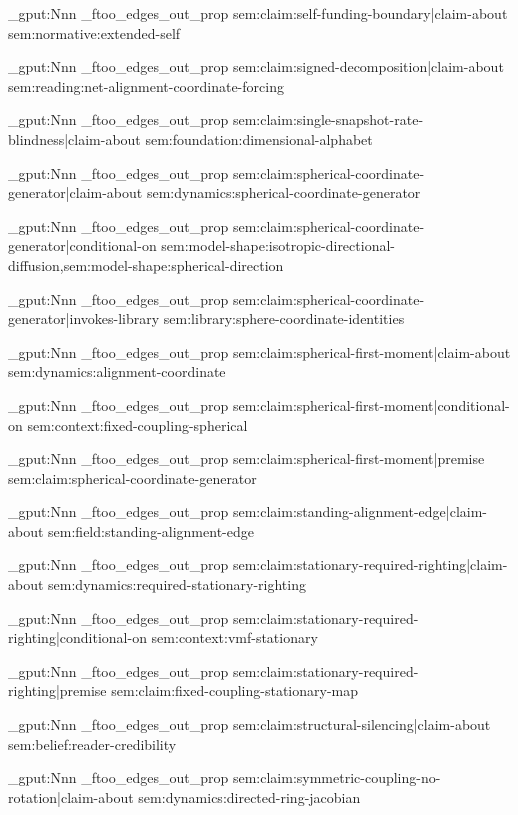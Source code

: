 \prop_gput:Nnn \g_ftoo_edges_out_prop { sem:claim:self-funding-boundary|claim-about } { sem:normative:extended-self }

\prop_gput:Nnn \g_ftoo_edges_out_prop { sem:claim:signed-decomposition|claim-about } { sem:reading:net-alignment-coordinate-forcing }

\prop_gput:Nnn \g_ftoo_edges_out_prop { sem:claim:single-snapshot-rate-blindness|claim-about } { sem:foundation:dimensional-alphabet }

\prop_gput:Nnn \g_ftoo_edges_out_prop { sem:claim:spherical-coordinate-generator|claim-about } { sem:dynamics:spherical-coordinate-generator }

\prop_gput:Nnn \g_ftoo_edges_out_prop { sem:claim:spherical-coordinate-generator|conditional-on } { sem:model-shape:isotropic-directional-diffusion,sem:model-shape:spherical-direction }

\prop_gput:Nnn \g_ftoo_edges_out_prop { sem:claim:spherical-coordinate-generator|invokes-library } { sem:library:sphere-coordinate-identities }

\prop_gput:Nnn \g_ftoo_edges_out_prop { sem:claim:spherical-first-moment|claim-about } { sem:dynamics:alignment-coordinate }

\prop_gput:Nnn \g_ftoo_edges_out_prop { sem:claim:spherical-first-moment|conditional-on } { sem:context:fixed-coupling-spherical }

\prop_gput:Nnn \g_ftoo_edges_out_prop { sem:claim:spherical-first-moment|premise } { sem:claim:spherical-coordinate-generator }

\prop_gput:Nnn \g_ftoo_edges_out_prop { sem:claim:standing-alignment-edge|claim-about } { sem:field:standing-alignment-edge }

\prop_gput:Nnn \g_ftoo_edges_out_prop { sem:claim:stationary-required-righting|claim-about } { sem:dynamics:required-stationary-righting }

\prop_gput:Nnn \g_ftoo_edges_out_prop { sem:claim:stationary-required-righting|conditional-on } { sem:context:vmf-stationary }

\prop_gput:Nnn \g_ftoo_edges_out_prop { sem:claim:stationary-required-righting|premise } { sem:claim:fixed-coupling-stationary-map }

\prop_gput:Nnn \g_ftoo_edges_out_prop { sem:claim:structural-silencing|claim-about } { sem:belief:reader-credibility }

\prop_gput:Nnn \g_ftoo_edges_out_prop { sem:claim:symmetric-coupling-no-rotation|claim-about } { sem:dynamics:directed-ring-jacobian }

